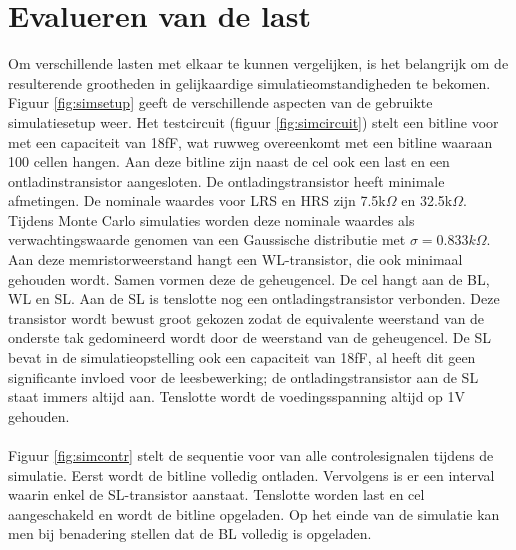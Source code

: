 \section{Evalueren van de last}
Om verschillende lasten met elkaar te kunnen vergelijken, is het belangrijk om de resulterende grootheden in gelijkaardige simulatieomstandigheden te bekomen. Figuur \ref{fig:simsetup} geeft de verschillende aspecten van de gebruikte simulatiesetup weer. Het testcircuit (figuur \ref{fig:simcircuit}) stelt een bitline voor met een capaciteit van 18fF, wat ruwweg overeenkomt met een bitline waaraan 100 cellen hangen. Aan deze bitline zijn naast de cel ook een last en een ontladinstransistor aangesloten. De ontladingstransistor heeft minimale afmetingen. De nominale waardes voor LRS en HRS zijn 7.5k$\Omega$ en 32.5k$\Omega$. Tijdens Monte Carlo simulaties worden deze nominale waardes als verwachtingswaarde genomen van een Gaussische distributie met $\sigma = 0.833k\Omega$. Aan deze memristorweerstand hangt een WL-transistor, die ook minimaal gehouden wordt. Samen vormen deze de geheugencel. De cel hangt aan de BL, WL en SL. Aan de SL is tenslotte nog een ontladingstransistor verbonden. Deze transistor wordt bewust groot gekozen zodat de equivalente weerstand van de onderste tak gedomineerd wordt door de weerstand van de geheugencel. De SL bevat in de simulatieopstelling ook een capaciteit van 18fF, al heeft dit geen significante invloed voor de leesbewerking; de ontladingstransistor aan de SL staat immers altijd aan. Tenslotte wordt de voedingsspanning altijd op 1V gehouden.\\\\
Figuur \ref{fig:simcontr} stelt de sequentie voor van alle controlesignalen tijdens de simulatie. Eerst wordt de bitline volledig ontladen. Vervolgens is er een interval waarin enkel de SL-transistor aanstaat. Tenslotte worden last en cel aangeschakeld en wordt de bitline opgeladen. Op het einde van de simulatie kan men bij benadering stellen dat de BL volledig is opgeladen.\\

